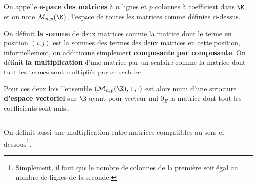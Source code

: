 \subsection*{}
On appelle \textbf{espace des matrices} à \(n\) lignes et \(p\) colonnes à coefficient dans \(\K\), et on note \(\mathcal{M}_{n, p}(\K)\), l'espace de toutes les matrices comme définies ci-dessus.\<

On définit \textbf{la somme} de deux matrices comme la matrice dont le terme en position \((i, j)\) est la sommes des termes des deux matrices en cette position, informellement, on additionne simplement \textbf{composante par composante}.\+
On définit \textbf{la multiplication} d'une matrice par un scalaire comme la matrice dont tout les termes sont multipliés par ce scalaire.\<

Pour ces deux lois l'ensemble \((\mathcal{M}_{n, p}(\K), +, \cdot)\) est alors muni d'une structure \textbf{d'espace vectoriel} sur \(\K\) ayant pour vecteur nul \(0_E\) la matrice dont tout les coefficients sont nuls..

\subsection*{}
On définit aussi une multiplication entre matrices compatibles au sens ci-dessous\footnote[1]{Simplement, il faut que le nombre de colonnes de la première soit égal au nombre de lignes de la seconde.}.\<

